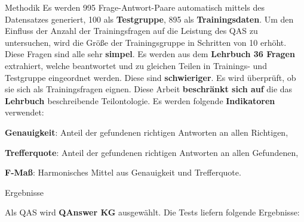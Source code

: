 \documentclass[portrait,final,a0paper,fontscale=0.320]{imiseposter}
\begin{document}
\begin{poster}
\begin{posterbox}[name=methods,below=background]{Methodik}
Es werden 995 Frage-Antwort-Paare automatisch mittels des Datensatzes generiert, 100 als \textbf{Testgruppe}, 895 als \textbf{Trainingsdaten}.
Um den Einfluss der Anzahl der Trainingsfragen auf die Leistung des QAS zu untersuchen, wird die Größe der Trainingsgruppe in Schritten von 10 erhöht.
Diese Fragen sind alle sehr \textbf{simpel}.
Es werden aus dem \textbf{Lehrbuch \cite{bb} 36 Fragen} extrahiert, welche beantwortet und zu gleichen Teilen in Trainings- und Testgruppe eingeordnet werden.
Diese sind \textbf{schwieriger}.
Es wird überprüft, ob sie sich als Trainingsfragen eignen.
Diese Arbeit \textbf{beschränkt sich auf} die das \textbf{Lehrbuch \cite{bb}} beschreibende Teilontologie.
Es werden folgende \textbf{Indikatoren} verwendet:

\textbf{Genauigkeit}: Anteil der gefundenen richtigen Antworten an allen Richtigen,

\textbf{Trefferquote}: Anteil der gefundenen richtigen Antworten an allen Gefundenen,

\textbf{F-Maß}: Harmonisches Mittel aus Genauigkeit und Trefferquote.
\end{posterbox}
\begin{posterbox}[name=results,column=1]{Ergebnisse}

Als QAS wird \textbf{QAnswer KG} \cite{qanswer} ausgewählt.
Die Tests liefern folgende Ergebnisse:


\end{posterbox}
\end{poster}
\end{document}
